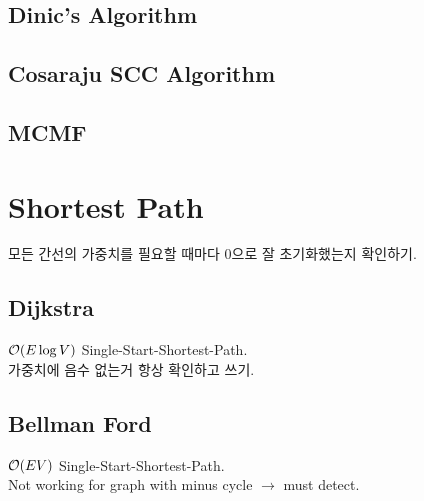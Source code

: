 \documentclass[landscape,8pt]{article}
\begin{document}
\begin{multicols}{2}
  \subsection{Dinic's Algorithm}
    

  \subsection{Cosaraju SCC Algorithm}
    

 \subsection{MCMF}
    



\section{Shortest Path}
  모든 간선의 가중치를 필요할 때마다 0으로 잘 초기화했는지 확인하기.
  \subsection{Dijkstra}
    $\order{E \log V}$ Single-Start-Shortest-Path.\\
    가중치에 음수 없는거 항상 확인하고 쓰기.
      

  \subsection{Bellman Ford}
    $\order{EV}$ Single-Start-Shortest-Path.\\
    Not working for graph with minus cycle $\rightarrow$ must detect.
      


\end{multicols}
\end{document}

